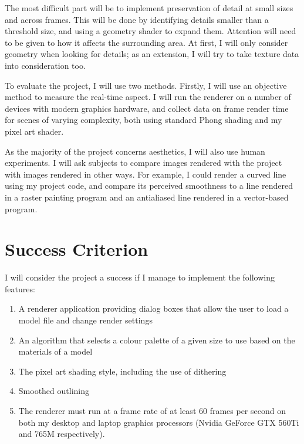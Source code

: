 \documentclass[12pt]{article}
\begin{document}
The most difficult part will be to implement preservation of detail at small sizes and across frames. This will be done by identifying details smaller than a threshold size, and using a geometry shader to expand them. Attention will need to be given to how it affects the surrounding area. At first, I will only consider geometry when looking for details; as an extension, I will try to take texture data into consideration too.

To evaluate the project, I will use two methods. Firstly, I will use an objective method to measure the real-time aspect. I will run the renderer on a number of devices with modern graphics hardware, and collect data on frame render time for scenes of varying complexity, both using standard Phong shading and my pixel art shader.

As the majority of the project concerns aesthetics, I will also use human experiments. I will ask subjects to compare images rendered with the project with images rendered in other ways. For example, I could render a curved line using my project code, and compare its perceived smoothness to a line rendered in a raster painting program and an antialiased line rendered in a vector-based program.

\section*{Success Criterion}

I will consider the project a success if I manage to implement the following features:

\begin{enumerate}

\item A renderer application providing dialog boxes that allow the user to load a model file and change render settings

\item An algorithm that selects a colour palette of a given size to use based on the materials of a model

\item The pixel art shading style, including the use of dithering

\item Smoothed outlining

\item The renderer must run at a frame rate of at least 60 frames per second on both my desktop and laptop graphics processors (Nvidia GeForce GTX 560Ti and 765M respectively).

\end{enumerate}
\end{document}
